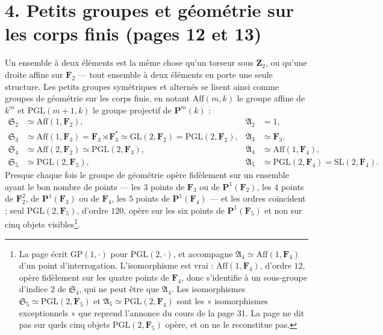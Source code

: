 \documentclass[11pt,a4paper]{article}
\begin{document}
\section*{4. Petits groupes et géométrie sur les corps finis (pages 12 et 13)}

Un ensemble à deux éléments est la même chose qu'un torseur sous
$\mathbf{Z}_2$, ou qu'une droite affine sur $\mathbf{F}_2$ --- tout ensemble à
deux éléments en porte une seule structure. Les petits groupes symétriques et
alternés se lisent ainsi comme groupes de géométrie sur les corps finis, en
notant $\mathrm{Aff}(m, k)$ le groupe affine de $k^m$ et $\mathrm{PGL}(m+1,
k)$ le groupe projectif de $\mathbf{P}^m(k)$ :
\begin{align*}
  \mathfrak{S}_2 &\simeq \mathrm{Aff}(1, \mathbf{F}_2), & \mathfrak{A}_2 &= 1, \\
  \mathfrak{S}_3 &\simeq \mathrm{Aff}(1, \mathbf{F}_3) = \mathbf{F}_3 \rtimes \mathbf{F}_3^{*}
    \simeq \mathrm{GL}(2, \mathbf{F}_2) = \mathrm{PGL}(2, \mathbf{F}_2), &
    \mathfrak{A}_3 &\simeq \mathbf{F}_3, \\
  \mathfrak{S}_4 &\simeq \mathrm{Aff}(2, \mathbf{F}_2) \simeq \mathrm{PGL}(2, \mathbf{F}_3), &
    \mathfrak{A}_4 &\simeq \mathrm{Aff}(1, \mathbf{F}_4), \\
  \mathfrak{S}_5 &\simeq \mathrm{PGL}(2, \mathbf{F}_5), &
    \mathfrak{A}_5 &\simeq \mathrm{PGL}(2, \mathbf{F}_4) = \mathrm{SL}(2, \mathbf{F}_4).
\end{align*}
Presque chaque fois le groupe de géométrie opère fidèlement sur un ensemble
ayant le bon nombre de points --- les $3$ points de $\mathbf{F}_3$ ou de
$\mathbf{P}^1(\mathbf{F}_2)$, les $4$ points de $\mathbf{F}_2^2$, de
$\mathbf{P}^1(\mathbf{F}_3)$ ou de $\mathbf{F}_4$, les $5$ points de
$\mathbf{P}^1(\mathbf{F}_4)$ --- et les ordres coïncident ; seul
$\mathrm{PGL}(2, \mathbf{F}_5)$, d'ordre $120$, opère sur les six points de
$\mathbf{P}^1(\mathbf{F}_5)$ et non sur cinq objets visibles\footnote{La page écrit $\mathrm{GP}(1,
\cdot)$ pour $\mathrm{PGL}(2, \cdot)$, et accompagne $\mathfrak{A}_4 \simeq
\mathrm{Aff}(1, \mathbf{F}_4)$ d'un point d'interrogation. L'isomorphisme est
vrai : $\mathrm{Aff}(1, \mathbf{F}_4)$, d'ordre $12$, opère fidèlement sur les
quatre points de $\mathbf{F}_4$, donc s'identifie à un sous-groupe d'indice
$2$ de $\mathfrak{S}_4$, qui ne peut être que $\mathfrak{A}_4$. Les
isomorphismes $\mathfrak{S}_5 \simeq \mathrm{PGL}(2, \mathbf{F}_5)$ et
$\mathfrak{A}_5 \simeq \mathrm{PGL}(2, \mathbf{F}_4)$ sont les
« isomorphismes exceptionnels » que reprend l'annonce du cours de la
page 31. La page ne dit pas sur quels cinq objets $\mathrm{PGL}(2,
\mathbf{F}_5)$ opère, et on ne le reconstitue pas.}.
\end{document}
